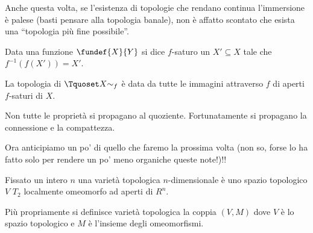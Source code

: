 \begin{oss}
Anche questa volta, se l'esistenza di topologie che rendano continua l'immersione è palese (basti pensare alla topologia banale), non è affatto scontato che esista una ``topologia più fine possibile''.
\end{oss}

\begin{defn}
Data una funzione $\fundef{X}{Y}$ si dice $f$-saturo un $X'\subseteq X$ tale che $f^{-1}(f(X'))=X'$.
\end{defn}

\begin{prop}
La topologia di $\Tquoset X{\sim_f}$ è data da tutte le immagini attraverso $f$ di aperti $f$-saturi di $X$.
\end{prop}

\begin{oss} 
Non tutte le proprietà si propagano al quoziente. Fortunatamente si propagano la connessione e la compattezza.
\end{oss}





Ora anticipiamo un po' di quello che faremo la prossima volta (non so, forse lo ha fatto solo per rendere un po' meno organiche queste note!)!!

\marginpar{!!!!!!!!!!!!!!}

\begin{defn}
Fissato un intero $n$ una varietà topologica $n$-dimensionale è uno spazio topologico $V$ $T_2$ localmente omeomorfo ad aperti di $R^n$.

Più propriamente si definisce varietà topologica la coppia $(V, M)$ dove $V$ è lo spazio topologico e $M$ è l'insieme degli omeomorfismi.
\end{defn}
